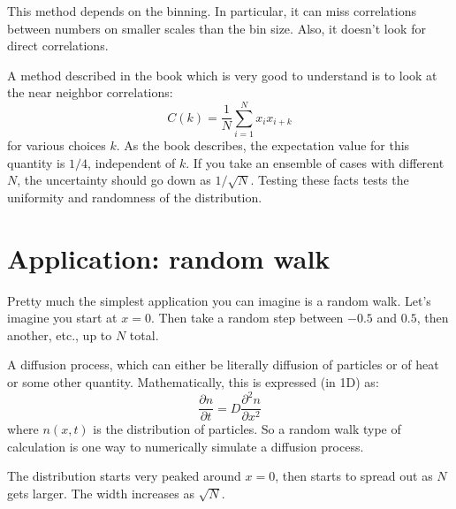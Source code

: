 This method depends on the binning. In particular, it can miss
correlations between numbers on smaller scales than the bin
size. Also, it doesn't look for direct correlations. 

A method described in the book which is very good to understand is to
look at the near neighbor correlations: 
\begin{equation}
C(k) = \frac{1}{N} \sum_{i=1}^{N} x_i x_{i+k}
\end{equation}
for various choices $k$.  As the book describes, the expectation value
for this quantity is $1/4$, independent of $k$. If you take an
ensemble of cases with different $N$, the uncertainty should go down
as $1/\sqrt{N}$. Testing these facts tests the uniformity and
randomness of the distribution.

\section{Application: random walk}

Pretty much the simplest application you can imagine is a random
walk. Let's imagine you start at $x=0$. Then take a random step
between $-0.5$ and $0.5$, then another, etc., up to $N$ total.


\begin{answer}
  A diffusion process, which can either be literally diffusion of
  particles or of heat or some other quantity. Mathematically, this is
  expressed (in 1D) as:
  \begin{equation}
    \frac{\partial n}{\partial t} = D \frac{\partial^2 n}{\partial
      x^2}
  \end{equation}
   where $n(x, t)$ is the distribution of particles. So a random walk
   type of calculation is one way to numerically simulate a diffusion
   process. 
\end{answer}


\begin{answer}
The distribution starts very peaked around $x=0$, then starts to
spread out as $N$ gets larger. The width increases as $\sqrt{N}$.
\end{answer}

